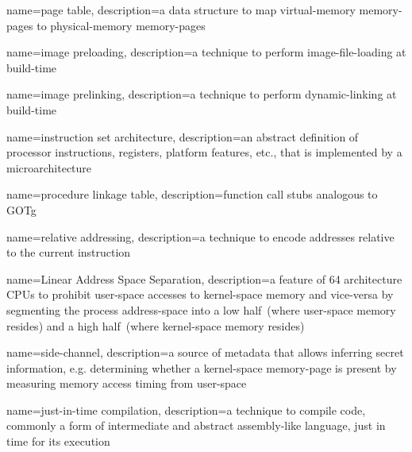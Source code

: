 {
  name={page table},
  description={a data structure to map \gls{virtual-memory} \glspl{memory-page} to \gls{physical-memory} \glspl{memory-page}}
}

{
  name={\gls{image} preloading},
  description={a technique to perform \gls{image-file-loading} at build-time}
}

{
  name={\gls{image} prelinking},
  description={a technique to perform \gls{dynamic-linking} at build-time}
}

{
  name={instruction set architecture},
  description={an abstract definition of processor instructions, registers, platform features, etc., that is implemented by a microarchitecture}
}


{
  name={procedure linkage table},
  description={function call stubs analogous to \gls{GOTg}}
}

{
  name={relative addressing},
  description={a technique to encode addresses relative to the current  instruction}
}

{
  name={Linear Address Space Separation},
  description={a feature of  64 architecture \glspl{CPU} to prohibit \gls{user-space} accesses to \gls{kernel-space} memory and vice-versa by segmenting the process \gls{address-space} into a low half~(where \gls{user-space} memory resides) and a high half~(where \gls{kernel-space} memory resides)}
}

{
  name={side-channel},
  description={a source of metadata that allows inferring secret information, e.g. determining whether a \gls{kernel-space} \gls{memory-page} is present by measuring memory access timing from \gls{user-space}}
}

{
  name={just-in-time compilation},
  description={a technique to compile code, commonly a form of intermediate and abstract assembly-like language, just in time for its execution}
}

